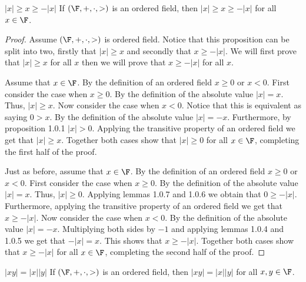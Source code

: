 \documentclass{report}
\begin{document}
\begin{proposition}{$|x| \geq x \geq -|x|$}{}
  If $\left(\F, +, \cdot, >\right)$ is an ordered field,
  then $|x| \geq x \geq -|x|$ for all $x \in \F$.
\end{proposition}

\begin{proof}
  Assume $\left(\F, +, \cdot, >\right)$ is ordered field.
  Notice that this proposition can be split into two, firstly that $|x| \geq x$ and secondly that $x \geq -|x|$.
  We will first prove that $|x| \geq x$ for all $x$ then we will prove that $x \geq -|x|$ for all $x$.

  Assume that $x \in \F$.
  By the definition of an ordered field $x \geq 0$ or $x < 0$.
  First consider the case when $x \geq 0$.
  By the definition of the absolute value $|x| = x$.
  Thus, $|x| \geq x$.
  Now consider the case when $x < 0$.
  Notice that this is equivalent as saying $0 > x$.
  By the definition of the absolute value $|x| = -x$.
  Furthermore, by proposition 1.0.1 $|x| > 0$.
  Applying the transitive property of an ordered field we get that $|x| \geq x$.
  Together both cases show that $|x| \geq 0$ for all $x \in \F$, completing the first half of the proof.

  Just as before, assume that $x \in \F$.
  By the definition of an ordered field $x \geq 0$ or $x < 0$.
  First consider the case when $x \geq 0$.
  By the definition of the absolute value $|x| = x$.
  Thus, $|x| \geq 0$.
  Applying lemmas 1.0.7 and 1.0.6 we obtain that $0 \geq -|x|$.
  Furthermore, applying the transitive property of an ordered field we get that $x \geq -|x|$.
  Now consider the case when $x < 0$.
  By the definition of the absolute value $|x| = -x$.
  Multiplying both sides by $-1$ and applying lemmas 1.0.4 and 1.0.5 we get that $-|x| = x$.
  This shows that $x \geq -|x|$.
  Together both cases show that $x \geq -|x|$ for all $x \in \F$, completing the second half of the proof.
\end{proof}

\begin{proposition}{$|xy| = |x||y|$}{}
  If $\left(\F, +, \cdot, >\right)$ is an ordered field,
  then $|xy| = |x||y|$ for all $x,y \in \F$.
\end{proposition}
\end{document}
